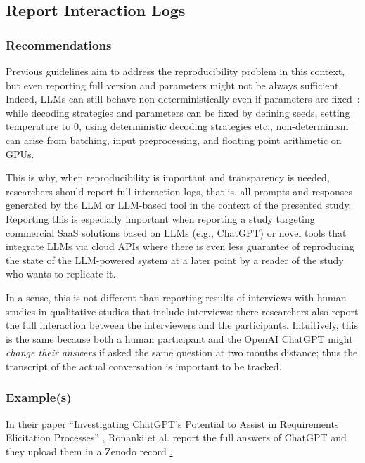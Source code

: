 \documentclass[11pt]{article}
\begin{document}
\subsection{Report Interaction Logs}

\subsubsection{Recommendations}

Previous guidelines aim to address the reproducibility problem in this context, but even reporting full version and parameters might not be always sufficient. Indeed, LLMs can still behave non-deterministically even if parameters are fixed~\cite{Chann2023}: while decoding strategies and parameters can be fixed by defining seeds, setting temperature to 0, using deterministic decoding strategies etc., non-determinism can arise from batching, input preprocessing, and floating point arithmetic on GPUs. 

This is why, when reproducibility is important and transparency is needed, researchers should report full interaction logs, that is, all prompts and responses generated by the LLM or LLM-based tool in the context of the presented study. 
Reporting this is especially important when reporting a study targeting commercial SaaS solutions based on LLMs (e.g., ChatGPT) or novel tools that integrate LLMs via cloud APIs where there is even less guarantee of reproducing the state of the LLM-powered system at a later point by a reader of the study who wants to replicate it. 

In a sense, this is not different than reporting results of interviews with human studies in qualitative studies that include interviews: there researchers also report the full interaction between the interviewers and the participants. Intuitively, this is the same because both a human participant and the OpenAI ChatGPT might {\em change their answers} if asked the same question at two months distance; thus the transcript of the actual conversation is important to be tracked.


\subsubsection{Example(s)}

In their paper ``Investigating ChatGPT's Potential to Assist in Requirements Elicitation Processes'' \cite{ronanki2023investigating}, Ronanki et al. report the full answers of ChatGPT and they upload them in a Zenodo record \href{https://zenodo.org/records/8124936}. 
\end{document}
